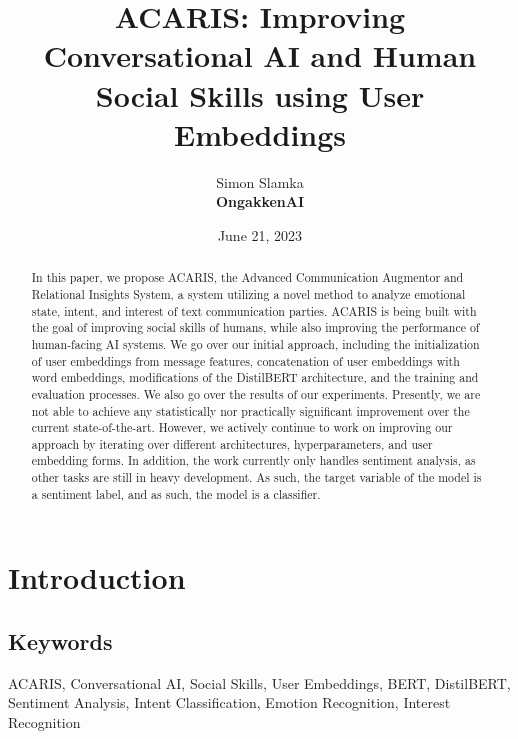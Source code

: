 \documentclass{article}
\title{ACARIS: Improving Conversational AI and Human Social Skills using User Embeddings}
\author{Simon Slamka\\
\small\textbf{OngakkenAI}}
\date{June 21, 2023}
\begin{document}
\maketitle

\begin{abstract}
In this paper, we propose ACARIS, the Advanced Communication Augmentor and Relational Insights System, a system utilizing a novel method to analyze emotional state, intent, and interest of text communication parties. ACARIS is being built with the goal of improving social skills of humans, while also improving the performance of human-facing AI systems. We go over our initial approach, including the initialization of user embeddings from message features, concatenation of user embeddings with word embeddings, modifications of the DistilBERT architecture, and the training and evaluation processes. We also go over the results of our experiments. Presently, we are not able to achieve any statistically nor practically significant improvement over the current state-of-the-art. However, we actively continue to work on improving our approach by iterating over different architectures, hyperparameters, and user embedding forms. In addition, the work currently only handles sentiment analysis, as other tasks are still in heavy development. As such, the target variable of the model is a sentiment label, and as such, the model is a classifier.
\end{abstract}

\section{Introduction}
\subsection{Keywords}
ACARIS, Conversational AI, Social Skills, User Embeddings, BERT, DistilBERT, Sentiment Analysis, Intent Classification, Emotion Recognition, Interest Recognition
\end{document}
